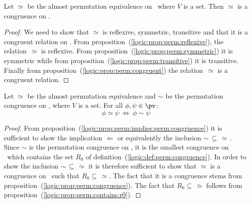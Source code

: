 \begin{prop}\label{logic:prop:perm:congruence}
Let $\simeq$ be the almost permutation equivalence on \pv\ where $V$
is a set. Then $\simeq$ is a congruence on \pv.
\end{prop}
\begin{proof}
We need to show that $\simeq$ is reflexive, symmetric, transitive
and that it is a congruent relation on \pv. From
proposition~(\ref{logic:prop:perm:reflexive}), the relation~$\simeq$
is reflexive. From proposition~(\ref{logic:prop:perm:symmetric}) it
is symmetric while from
proposition~(\ref{logic:prop:perm:transitive}) it is transitive.
Finally from proposition~(\ref{logic:prop:perm:congruent}) the
relation~$\simeq$ is a congruent relation.
\end{proof}


\begin{prop}\label{logic:prop:perm:is:perm:congruence}
Let $\simeq$ be the almost permutation equivalence and $\sim$ be the
permutation congruence on \pv, where $V$ is a set. For all
$\phi,\psi\in\pv$:
    \[
    \phi\simeq\psi\ \Leftrightarrow\ \phi\sim\psi
    \]
\end{prop}
\begin{proof}
From proposition~(\ref{logic:prop:perm:implies:perm:congruence}) it
is sufficient to show the implication $\Leftarrow$ or equivalently
the inclusion $\sim\,\subseteq\,\simeq\,$. Since $\sim$ is the
permutation congruence on \pv, it is the smallest congruence on \pv\
which contains the set $R_{0}$ of
definition~(\ref{logic:def:perm:congruence}). In order to show the
inclusion $\sim\,\subseteq\,\simeq$ it is therefore sufficient to
show that $\simeq$ is a congruence on \pv\ such that
$R_{0}\subseteq\,\simeq$. The fact that it is a congruence stems
from proposition~(\ref{logic:prop:perm:congruence}). The fact that
$R_{0}\subseteq\,\simeq$ follows from
proposition~(\ref{logic:prop:perm:contains:r0}).
\end{proof}

